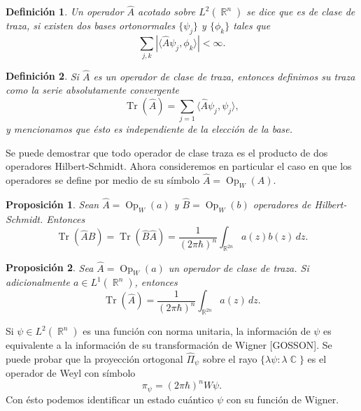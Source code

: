\documentclass[a4paper]{report}
\DeclareMathOperator{\R}{\mathbb{R}}
\DeclareMathOperator{\C}{\mathbb{C}}
\DeclareMathOperator{\Tr}{Tr}
\DeclareMathOperator{\Op}{Op}
\newtheorem{definition}{Definición}
\newtheorem{proposition}{Proposición}
\begin{document}
  \begin{definition}
    Un operador $\hat{A}$ acotado sobre $L^2(\R^{n})$ se
    dice que es de clase de traza, si existen dos bases
    ortonormales $\{\psi_j\}$ y $\{\phi_k\}$ tales que
    \begin{equation}
      \sum_{j,k}^{} \left|
      \langle \hat{A} \psi_j, \phi_k \rangle
      \right| < \infty.
    \end{equation}
  \end{definition}

  \begin{definition}
    Si $\hat{A}$ es un operador de clase de traza, entonces
    definimos su traza como la serie absolutamente
    convergente
    \begin{equation}
      \Tr\left( \hat{A} \right) 
      = \sum_{j=1}^{} \langle \hat{A}\psi_j, \psi_j \rangle,
    \end{equation}
    y mencionamos que ésto es independiente de la elección
    de la base.
  \end{definition}

  Se puede demostrar que todo operador de clase traza es el
  producto de dos operadores Hilbert-Schmidt. Ahora
  consideremos en particular el caso en que los operadores
  se define por medio de su símbolo $\hat{A} = \Op_W(A)$.

  \begin{proposition}
    Sean $\hat{A} = \Op_W(a)$ y $\hat{B} = \Op_W(b)$
    operadores de Hilbert-Schmidt. Entonces
    \begin{equation}
      \Tr\left( \hat{A}\hat{B} \right) 
      = \Tr\left( \hat{B}\hat{A} \right) 
      = \frac{1}{(2\pi\hbar)^{n}} \int_{\R^{2n}} a(z)b(z) \,
      dz.
    \end{equation}
  \end{proposition}

  \begin{proposition}
    Sea $\hat{A} = \Op_W(a)$ un operador de clase de traza.
    Si adicionalmente $a \in L^{1}(\R^{n})$, entonces
    \begin{equation}
      \Tr\left( \hat{A} \right) 
      = \frac{1}{(2\pi\hbar)^{n}} \int_{\R^{2n}} a(z) \, dz.
    \end{equation}
  \end{proposition}

  Si $\psi \in L^2(\R^{n})$ es una función con norma
  unitaria, la información de $\psi$ es equivalente a la
  información de su transformación de Wigner [GOSSON]. Se
  puede probar que la proyección ortogonal $\hat{\Pi}_\psi$ 
  sobre el rayo $\{\lambda \psi : \lambda \C\}$ es el
  operador de Weyl con símbolo
  \[
    \pi_\psi = (2\pi\hbar)^{n}W\psi.
  \] 
  Con ésto podemos identificar un estado cuántico $\psi$ con
  su función de Wigner.
\end{document}
